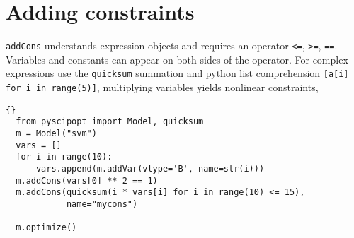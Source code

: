 \documentclass[11pt]{article}
\newcommand\ttt\texttt
\begin{document}
\section*{Adding constraints}

\ttt{addCons} understands expression objects and requires an operator \ttt{<=}, \ttt{>=}, \ttt{==}. Variables and constants can appear on both sides of the operator.
For complex expressions use the \ttt{quicksum} summation and python list comprehension \ttt{[a[i] for i in range(5)]}, multiplying variables yields nonlinear constraints,

\begin{lstlisting}[frame=tb]{}
  from pyscipopt import Model, quicksum
  m = Model("svm")
  vars = []
  for i in range(10):
      vars.append(m.addVar(vtype='B', name=str(i)))
  m.addCons(vars[0] ** 2 == 1)
  m.addCons(quicksum(i * vars[i] for i in range(10) <= 15),
            name="mycons")

  m.optimize()
\end{lstlisting}
\end{document}
